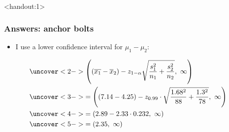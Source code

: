 \documentclass[handout]{beamer}\usepackage[]{graphicx}\usepackage[]{color}
\newcommand{\answers}{1}
\providecommand{\ov}[1]{\overline{#1}}
\numberwithin{equation}{section}
\begin{document}
\begin{frame}<handout:\answers>
\frametitle{Answers: anchor bolts}
\begin{itemize}
\item I use a lower confidence interval for $\mu_1 - \mu_2$:
\end{itemize}
\begin{align*}
&\uncover<2->{\left ((\ov{x_1} - \ov{x}_2) - z_{1 - \alpha} \sqrt{\frac{s^2_1}{n_1} + \frac{s^2_2}{n_2}}, \ \infty \right )}  \\
&\uncover<3->{= \left ((7.14 - 4.25) - z_{0.99} \cdot \sqrt{\frac{1.68^2}{88} + \frac{1.3^2}{78}}, \ \infty \right )} \\ 
&\uncover<4->{= (2.89 - 2.33 \cdot 0.232, \ \infty )} \\
&\uncover<5->{= (2.35, \ \infty)}
\end{align*}
\begin{itemize}
\end{itemize}
\end{frame}
\end{document}
